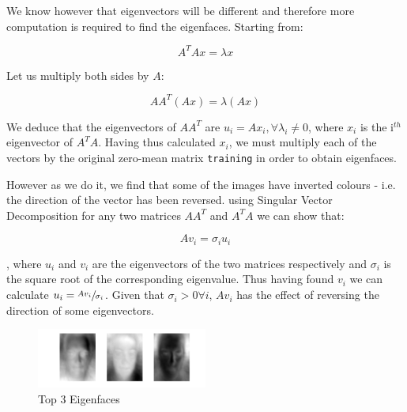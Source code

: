 \documentclass[10pt,twocolumn,letterpaper]{article}
\begin{document}
We know however that eigenvectors will be different and therefore more computation is required to find the eigenfaces. Starting from:

\begin{equation}
A^TAx = \lambda x
\end{equation}

Let us multiply both sides by $A$:

\begin{equation}
AA^T(Ax) = \lambda (Ax)
\end{equation}

We deduce that the eigenvectors of $AA^T$ are $u_i = Ax_i, \forall \lambda_i \neq 0$, where $x_i$ is the i$^{th}$ eigenvector of $A^TA$. Having thus calculated $x_i$, we must multiply each of the vectors by the original zero-mean matrix {\tt\small training} in order to obtain eigenfaces.

However as we do it, we find that some of the images have inverted colours - i.e. the direction of the vector has been reversed. using Singular Vector Decomposition for any two matrices $AA^T$ and $A^TA$ we can show that:

\begin{equation}
Av_i = \sigma_i u_i
\end{equation}

, where $u_i$ and $v_i$ are the eigenvectors of the two matrices respectively and $\sigma_i$ is the square root of the corresponding eigenvalue. Thus having found $v_i$ we can calculate $u_i = \sfrac{Av_i}{\sigma_i}$. Given that $\sigma_i > 0  \forall i$, $Av_i$ has the effect of reversing the direction of some eigenvectors.

\begin{figure}[H]
\centering
\includegraphics[width=0.5\textwidth]{../results/Q1B_PCA_Eigenfaces}

  \caption{Top 3 Eigenfaces \label{fig:Eig4}}

\end{figure}
\end{document}
